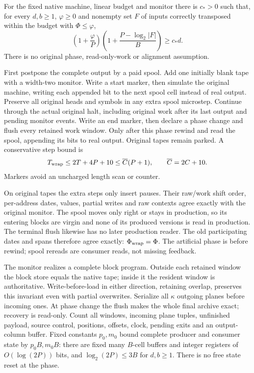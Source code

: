 \begin{theorem}\label{thm:whole-feedback}
\notformalized
For the fixed native machine, linear budget and monitor there is $c_*>0$
such that, for every $d,b\ge1$, $\varphi\ge0$ and nonempty set $F$ of
inputs correctly transposed within the budget with $\Phi\le\varphi$,
\[
 \left(1+\frac\varphi P\right)
 \left(1+\frac{P-\log_2|F|}{B}\right)\ge c_*d.
\]
There is no original phase, read-only-work or alignment assumption.
\end{theorem}
\begin{informalproof}
First postpone the complete output by a paid spool. Add one initially blank
tape with a width-two monitor. Write a start marker, then simulate the
original machine, writing each appended bit to the next spool cell instead
of real output. Preserve all original heads and symbols in any extra spool
microstep. Continue through the actual original halt, including original
work after its last output and pending monitor events. Write an end marker,
then declare a phase change and flush every retained work window. Only
after this phase rewind and read the spool, appending its bits to real output.
Original tapes remain parked. A conservative step bound is
\[
 T_{\rm wrap}\le2T+4P+10\le\overline C(P+1),\qquad
 \overline C=2C+10.
\]
Markers avoid an uncharged length scan or counter.

On original tapes the extra steps only insert pauses. Their raw/work shift
order, per-address dates, values, partial writes and raw contexts agree
exactly with the original monitor. The spool moves only right or stays in
production, so its entering blocks are virgin and none of its produced
versions is read in production. The terminal flush likewise has no later
production reader. The old participating dates and spans therefore agree
exactly: $\Phi_{\rm wrap}=\Phi$. The artificial phase is before rewind;
spool rereads are consumer reads, not missing feedback.

The monitor realizes a complete block program. Outside each retained window
the block store equals the native tape; inside it the resident window is
authoritative. Write-before-load in either direction, retaining overlap,
preserves this invariant even with partial overwrites. Serialize all
$\kappa$ outgoing planes before incoming ones. At phase change the flush
makes the whole final archive exact; recovery is read-only. Count all
windows, incoming plane tuples, unfinished payload, source control, positions,
offsets, clock, pending exits and an output-column buffer. Fixed constants
$p_0,m_0$ bound complete producer and consumer state by $p_0B,m_0B$:
there are fixed many $B$-cell buffers and integer registers of
$O(\log(2P))$ bits, and $\log_2(2P)\le3B$ for $d,b\ge1$.
There is no free state reset at the phase.


\end{informalproof}
